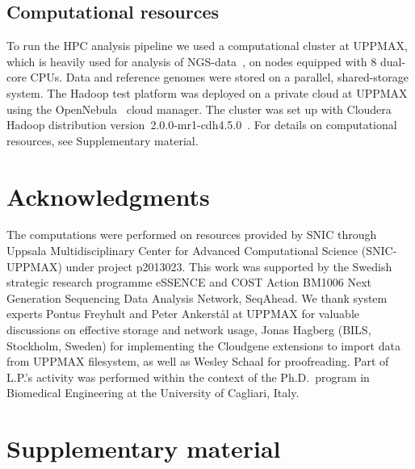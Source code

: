 \documentclass[10pt]{article}
\begin{document}
\subsection*{Computational resources}
To run the HPC analysis pipeline we used a computational cluster at UPPMAX, which is heavily used for analysis of NGS-data~\cite{lampa}, on nodes equipped with 8 dual-core CPUs. Data and reference genomes were stored on a parallel, shared-storage system. The Hadoop test platform was deployed on a private cloud at UPPMAX using the OpenNebula~\cite{opennebula} cloud manager. The cluster was set up with Cloudera Hadoop distribution version~2.0.0-mr1-cdh4.5.0~\cite{cloudera}. For details on computational resources, see Supplementary material.







\section*{Acknowledgments}
The computations were performed on resources provided by SNIC through Uppsala Multidisciplinary Center for Advanced Computational Science (SNIC-UPPMAX) under project p2013023. This work was supported by the Swedish strategic research programme eSSENCE and COST Action BM1006 Next Generation Sequencing Data Analysis Network, SeqAhead.
We thank system experts Pontus Freyhult and Peter Ankerst{\aa}l at UPPMAX for valuable discussions on effective storage and network usage, Jonas Hagberg (BILS, Stockholm, Sweden) for implementing the Cloudgene extensions to import data from UPPMAX filesystem, as well as Wesley Schaal for proofreading.
Part of L.P.'s activity was performed within the context of the Ph.D.\ program in
Biomedical Engineering at the University of Cagliari, Italy.





\section*{Supplementary material}
\end{document}
